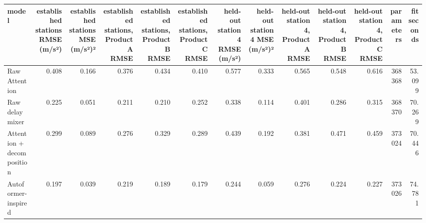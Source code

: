 \begin{tabular}{lrrrrrrrrrrrr}
\toprule
model & established stations RMSE (m/s²) & established stations MSE (m/s²)² & established stations, Product A RMSE & established stations, Product B RMSE & established stations, Product C RMSE & held-out station 4 RMSE (m/s²) & held-out station 4 MSE (m/s²)² & held-out station 4, Product A RMSE & held-out station 4, Product B RMSE & held-out station 4, Product C RMSE & parameters & fit seconds \\
\midrule
Raw Attention & 0.408 & 0.166 & 0.376 & 0.434 & 0.410 & 0.577 & 0.333 & 0.565 & 0.548 & 0.616 & 368368 & 53.099 \\
Raw delay mixer & 0.225 & 0.051 & 0.211 & 0.210 & 0.252 & 0.338 & 0.114 & 0.401 & 0.286 & 0.315 & 368370 & 70.269 \\
Attention + decomposition & 0.299 & 0.089 & 0.276 & 0.329 & 0.289 & 0.439 & 0.192 & 0.381 & 0.471 & 0.459 & 373024 & 70.446 \\
Autoformer-inspired & 0.197 & 0.039 & 0.219 & 0.189 & 0.179 & 0.244 & 0.059 & 0.276 & 0.224 & 0.227 & 373026 & 74.781 \\
\bottomrule
\end{tabular}
